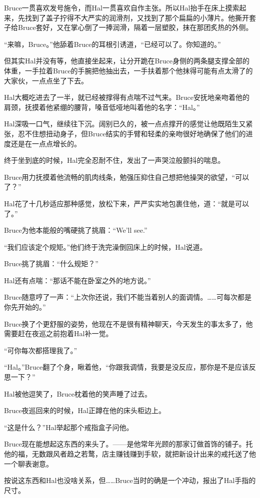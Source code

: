 \documentclass[../main.tex]{subfiles}
\begin{document}
Bruce一贯喜欢发号施令，而Hal一贯喜欢自作主张。所以Hal抬手在床上摸索起来，先找到了盖子拧得不大严实的润滑剂，又找到了那个扁扁的小薄片。他撕开套子给Bruce套好，又在掌心倒了一捧润滑，隔着一层塑胶，抹在那团炙热的外侧。

“来嘛，Bruce。”他舔着Bruce的耳根引诱道，“已经可以了。你知道的。”

但其实Hal并没有等，他直接坐起来，让分开跪在Bruce身侧的两条腿支撑全部的体重，一手拉着Bruce的手腕把他抽出去，一手扶着那个他抹得可能有点太滑了的大家伙，一点点坐了下去。

Hal大概吃进去了一半，就已经被撑得有点喘不过气来。Bruce安抚地亲吻着他的肩颈，抚摸着他紧绷的腰背，嗓音低哑地叫着他的名字：“Hal。”

Hal深吸一口气，继续往下沉。阔别已久的，被一点点撑开的感觉让他既陌生又紧张，忍不住想扭动身子，但Bruce结实的手臂和轻柔的亲吻很好地确保了他们的进度还是在一点点增长的。

终于坐到底的时候，Hal完全忍耐不住，发出了一声哭泣般颤抖的喘息。

Bruce用力抚摸着他流畅的肌肉线条，勉强压抑住自己想把他操哭的欲望，“可以了？”

Hal花了十几秒适应那种感觉，放松下来，严严实实地包裹住他，道：“就是可以了。”

Bruce为他本能般的嘴硬挑了挑眉：“We'll see.”

“我们应该定个规矩。”他们终于洗完澡倒回床上的时候，Hal说道。

Bruce挑了挑眉：“什么规矩？”

Hal还有点喘：“那话不能在卧室之外的地方说。”

Bruce随意哼了一声：“上次你还说，我们不能当着别人的面调情。\ldots\ldots 可每次都是你先开始的。”

Bruce换了个更舒服的姿势，他现在不是很有精神聊天，今天发生的事太多了，他需要赶在夜巡之前抱着Hal补一觉。

“可你每次都搭理我了。”

“Hal。”Bruce翻了个身，瞅着他，“你跟我调情，我要是没反应，那你是不是应该反思一下？”

Hal被他逗笑了，Bruce枕着他的笑声睡了过去。

Bruce夜巡回来的时候，Hal正蹲在他的床头柜边上。

“这是什么？”Hal举起那个戒指盒子问他。

Bruce现在能想起这东西的来头了。——是他常年光顾的那家订做首饰的铺子。托他的福，无数跟风者趋之若鹜，店主赚钱赚到手软，就把新设计出来的戒托送了他一个聊表谢意。

按说这东西和Hal也没啥关系，但\ldots\ldots Bruce当时的确是一个冲动，报出了Hal手指的尺寸。
\end{document}
